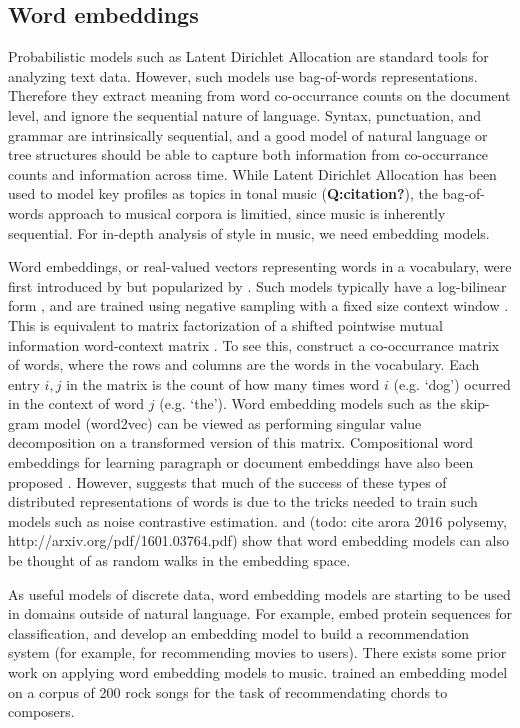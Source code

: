 
\subsection{Word embeddings}
Probabilistic models such as Latent Dirichlet Allocation \cite{Blei2003} are standard tools for analyzing text data. However, such models use bag-of-words representations. Therefore they extract meaning from word co-occurrance counts on the document level, and ignore the sequential nature of language. Syntax, punctuation, and grammar are intrinsically sequential, and a good model of natural language or tree structures should be able to capture both information from co-occurrance counts and information across time. While Latent Dirichlet Allocation has been used to model key profiles as topics in tonal music (\textbf{Q:citation?}), the bag-of-words approach to musical corpora is limitied, since music is inherently sequential. For in-depth analysis of style in music, we need embedding models.

Word embeddings, or real-valued vectors representing words in a vocabulary, were first introduced by \cite{Bengio2003} but popularized by \cite{Mikolov2013a}. Such models typically have a log-bilinear form \cite{Mnih2007}, and are trained using negative sampling with a fixed size context window \cite{Mikolov2013a}. This is equivalent to matrix factorization of a shifted pointwise mutual information word-context matrix \cite{Levy}. To see this, construct a co-occurrance matrix of words, where the rows and columns are the words in the vocabulary. Each entry $i, j$ in the matrix is the count of how many times word $i$ (e.g. `dog') ocurred in the context of word $j$ (e.g. `the'). Word embedding models such as the skip-gram model (word2vec) can be viewed as performing singular value decomposition on a transformed version of this matrix.  Compositional word embeddings for learning paragraph or document embeddings have also been proposed \cite{Le2014,Dai2015}. However, \cite{Levy2015a} suggests that much of the success of these types of distributed representations of words is due to the tricks needed to train such models such as noise contrastive estimation. \cite{Arora2015} and (todo: cite arora 2016 polysemy, http://arxiv.org/pdf/1601.03764.pdf) show that word embedding models can also be thought of as random walks in the embedding space.

As useful models of discrete data, word embedding models are starting to be used in domains outside of natural language. For example, \cite{Asgari2015} embed protein sequences for classification, and \cite{Guardia-Sebaoun2015} develop an embedding model to build a recommendation system (for example, for recommending movies to users).
There exists some prior work on applying word embedding models to music. \cite{Name2015} trained an embedding model on a corpus of 200 rock songs for the task of recommendating chords to composers.

